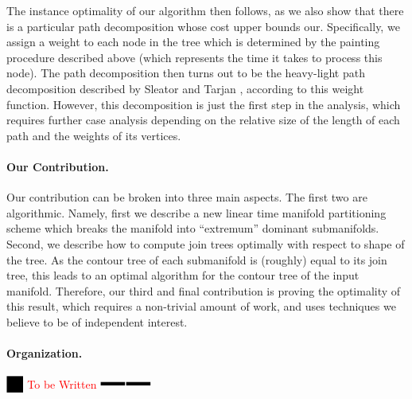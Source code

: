 \documentclass[11pt]{article}
\theoremstyle{definition}
\newcommand{\XSays}[2]{{
      {$\rule[-0.12cm]{0.2in}{0.5cm}$\fbox{\tt
            #1:} }
      \textcolor{red}{#2}
      \marginpar{\textcolor{blue}{#1}}
      {$\rule[0.1cm]{0.3in}{0.1cm}$\fbox{\tt
            end}$\rule[0.1cm]{0.3in}{0.1cm}$}
      }
   }
\newcommand{\Ben}[1]{{\XSays{Ben}{#1}}}
\begin{document}
The instance optimality of our algorithm then follows, as we also show that there is a particular path decomposition 
whose cost upper bounds our.  Specifically, we assign a weight to each node in the tree which is determined by 
the painting procedure described above (which represents the time it takes to process this node).  
The path decomposition then turns out to be the heavy-light path decomposition 
described by Sleator and Tarjan \cite{st-dsdt-83}, according to this weight function.
However, this decomposition is just the first step in the analysis, which 
requires further case analysis depending on the relative size of the length of each path 
and the weights of its vertices.

\paragraph{Our Contribution.}
Our contribution can be broken into three main aspects.  The first two are algorithmic.  Namely, 
first we describe a new linear time manifold partitioning scheme which breaks the manifold into 
``extremum'' dominant submanifolds.  
Second, we describe how to compute join trees optimally with respect to shape of the tree.
As the contour tree of each submanifold is (roughly) equal to its join tree, this leads to an 
optimal algorithm for the contour tree of the input manifold.  
Therefore, our third and final contribution is proving the optimality of this result, which 
requires a non-trivial amount of work, and uses techniques we believe to be of independent interest.

\paragraph{Organization.}
\Ben{To be Written}
\end{document}
